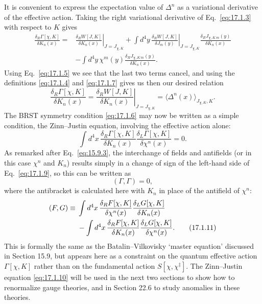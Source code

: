 It is convenient to express the expectation value of $\Delta^n$ as a variational derivative of the effective action. Taking the right variational derivative of Eq.~\eqref{eq:17.1.3} with respect to $K$ gives
\begin{align*}
\frac{\delta_R\Gamma[\chi,K]}{\delta K_n(x)}
={}&\left.\frac{\delta_R W[J,K]}{\delta K_n(x)}\right|_{J=J_{\chi,K}}
+\int d^4y\,
\left.\frac{\delta_R W[J,K]}{\delta J_m(y)}\right|_{J=J_{\chi,K}}
\frac{\delta_R J_{\chi,K\,m}(y)}{\delta K_n(x)}
\\
&-\int d^4y\,\chi^m(y)
\frac{\delta_R J_{\chi,K\,m}(y)}{\delta K_n(x)}.
\end{align*}
Using Eq.~\eqref{eq:17.1.5} we see that the last two terms cancel, and using the definitions \eqref{eq:17.1.4} and \eqref{eq:17.1.7} gives us then our desired relation
\begin{equation}
\frac{\delta_R\Gamma[\chi,K]}{\delta K_n(x)}
=\left.\frac{\delta_R W[J,K]}{\delta K_n(x)}\right|_{J=J_{\chi,K}}
=\langle\Delta^n(x)\rangle_{J_{\chi,K},K}.
\tag{17.1.8}\label{eq:17.1.8}
\end{equation}
The BRST symmetry condition \eqref{eq:17.1.6} may now be written as a simple condition, the Zinn--Justin equation, involving the effective action alone:
\begin{equation}
\int d^4x\,
\frac{\delta_R\Gamma[\chi,K]}{\delta K_n(x)}
\frac{\delta_L\Gamma[\chi,K]}{\delta\chi^n(x)}=0.
\tag{17.1.9}\label{eq:17.1.9}
\end{equation}
As remarked after Eq.~\eqref{eq:15.9.3}, the interchange of fields and antifields (or in this case $\chi^n$ and $K_n$) results simply in a change of sign of the left-hand side of Eq.~\eqref{eq:17.1.9}, so this can be written as
\begin{equation}
(\Gamma,\Gamma)=0,
\tag{17.1.10}\label{eq:17.1.10}
\end{equation}
where the antibracket is calculated here with $K_n$ in place of the antifield of $\chi^n$:
\begin{align}
(F,G)\equiv{}&\int d^4x\,
\frac{\delta_R F[\chi,K]}{\delta\chi^n(x)}
\frac{\delta_L G[\chi,K]}{\delta K_n(x)}
\notag\\
&-\int d^4x\,
\frac{\delta_R F[\chi,K]}{\delta K_n(x)}
\frac{\delta_L G[\chi,K]}{\delta\chi^n(x)}.
\tag{17.1.11}\label{eq:17.1.11}
\end{align}
This is formally the same as the Batalin--Vilkovisky `master equation' discussed in Section 15.9, but appears here as a constraint on the quantum effective action $\Gamma[\chi,K]$ rather than on the fundamental action $S[\chi,\chi^{\ddagger}]$. The Zinn--Justin equation \eqref{eq:17.1.10} will be used in the next two sections to show how to renormalize gauge theories, and in Section 22.6 to study anomalies in these theories.
